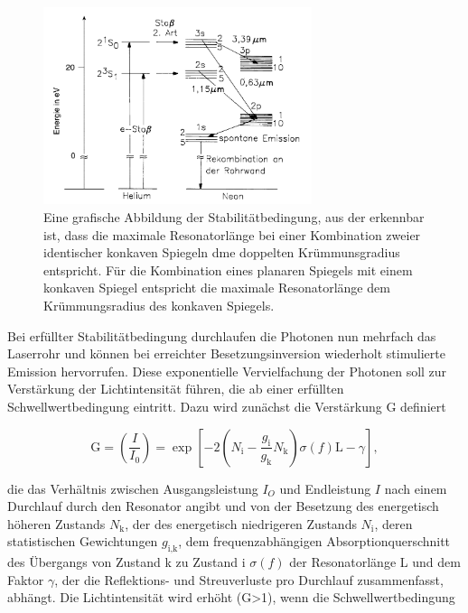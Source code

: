             \FloatBarrier
            \begin{figure}[h]
                \centering
                \includegraphics[width = 0.7\textwidth]{pictures/Termschema.png}
                \caption{Eine grafische Abbildung der Stabilitätbedingung, aus der erkennbar ist, dass die maximale Resonatorlänge bei einer Kombination zweier identischer konkaven Spiegeln dme doppelten Krümmunsgradius entspricht. Für die Kombination eines planaren Spiegels mit einem konkaven Spiegel entspricht die maximale Resonatorlänge dem Krümmungsradius des konkaven Spiegels.}
                \label{fig:stabilität}
            \end{figure}

            \FloatBarrier


            Bei erfüllter Stabilitätbedingung durchlaufen die Photonen nun mehrfach das Laserrohr und können bei erreichter Besetzungsinversion wiederholt stimulierte Emission hervorrufen. Diese exponentielle 
            Vervielfachung der Photonen soll zur Verstärkung der Lichtintensität führen, die ab einer erfüllten Schwellwertbedingung eintritt. Dazu wird zunächst die Verstärkung G definiert

            \begin{equation}
                \text{G} = \left(\frac{I}{I_0}\right) = \exp \left[-2\left(N_{\text{i}} - \frac{g_{\text{i}}}{g_{\text{k}}}N_{\text{k}}\right)\sigma(f)\text{L} - \gamma\right],
                \label{eqn:Verstärkung}
            \end{equation}

            die das Verhältnis zwischen Ausgangsleistung $I_O$ und Endleistung $I$ nach einem Durchlauf durch den Resonator angibt und von der Besetzung des energetisch höheren Zustands $N_{\text{k}}$, der des 
            energetisch niedrigeren Zustands $N_{\text{i}}$, deren statistischen Gewichtungen $g_{\text{i,k}}$, dem frequenzabhängigen Absorptionquerschnitt des Übergangs von Zustand k zu Zustand i $\sigma (f)$
            der Resonatorlänge L und dem Faktor $\gamma$, der die Reflektions- und Streuverluste pro Durchlauf zusammenfasst, abhängt. Die Lichtintensität wird erhöht (G>1), wenn die Schwellwertbedingung

